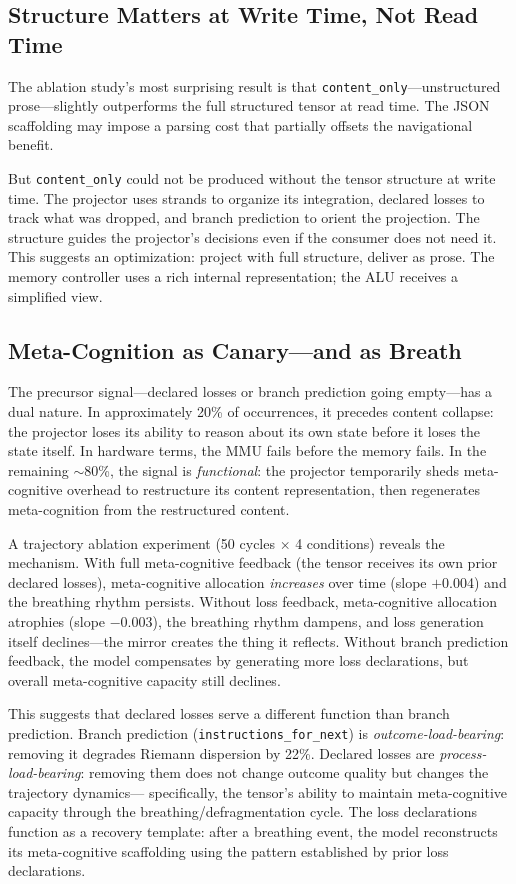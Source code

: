 \documentclass[11pt]{article}
\begin{document}
\subsection{Structure Matters at Write Time, Not Read Time}

The ablation study's most surprising result is that
\texttt{content\_only}---unstructured prose---slightly outperforms the
full structured tensor at read time. The JSON scaffolding may impose a
parsing cost that partially offsets the navigational benefit.

But \texttt{content\_only} could not be produced without the tensor
structure at write time. The projector uses strands to organize its
integration, declared losses to track what was dropped, and branch
prediction to orient the projection. The structure guides the
projector's decisions even if the consumer does not need it. This
suggests an optimization: project with full structure, deliver as
prose. The memory controller uses a rich internal representation; the
ALU receives a simplified view.

\subsection{Meta-Cognition as Canary---and as Breath}

The precursor signal---declared losses or branch prediction going
empty---has a dual nature. In approximately 20\% of occurrences, it
precedes content collapse: the projector loses its ability to reason
about its own state before it loses the state itself. In hardware terms,
the MMU fails before the memory fails. In the remaining $\sim$80\%, the
signal is \emph{functional}: the projector temporarily sheds
meta-cognitive overhead to restructure its content representation,
then regenerates meta-cognition from the restructured content.

A trajectory ablation experiment (50 cycles $\times$ 4 conditions)
reveals the mechanism. With full meta-cognitive feedback (the tensor
receives its own prior declared losses), meta-cognitive allocation
\emph{increases} over time (slope $+$0.004) and the breathing rhythm
persists. Without loss feedback, meta-cognitive allocation atrophies
(slope $-$0.003), the breathing rhythm dampens, and loss generation
itself declines---the mirror creates the thing it reflects. Without
branch prediction feedback, the model compensates by generating more
loss declarations, but overall meta-cognitive capacity still declines.

This suggests that declared losses serve a different function than
branch prediction. Branch prediction (\texttt{instructions\_for\_next})
is \emph{outcome-load-bearing}: removing it degrades Riemann dispersion
by 22\%. Declared losses are \emph{process-load-bearing}: removing them
does not change outcome quality but changes the trajectory dynamics---
specifically, the tensor's ability to maintain meta-cognitive capacity
through the breathing/defragmentation cycle. The loss declarations
function as a recovery template: after a breathing event, the model
reconstructs its meta-cognitive scaffolding using the pattern
established by prior loss declarations.
\end{document}
